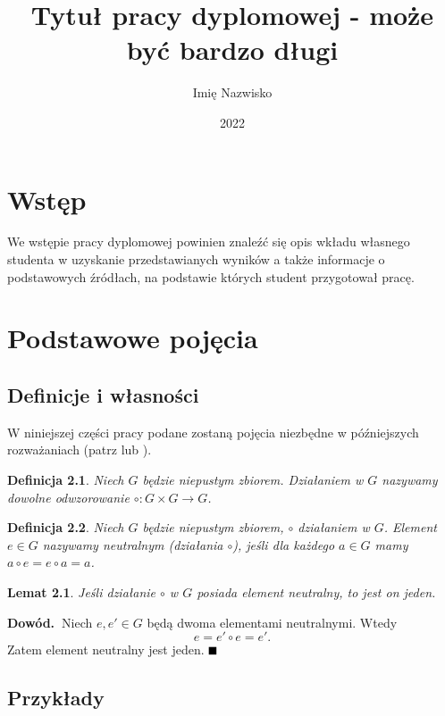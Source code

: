 \documentclass[magisterska]{pracadypl}
\author{Imię Nazwisko}
\title{Tytuł pracy dyplomowej - może być bardzo długi}
\date{2022}
\def\pd{\noindent \textbf{Dowód.~}} %
\def\kd{\hfill\mbox{$\rule{2mm}{2mm}$}} %
\newtheorem{defi}{Definicja}[section]
\newtheorem{lem}{Lemat}[section]
\begin{document}
\maketitle
\tableofcontents
\newpage



\chapter{Wstęp}

We wstępie pracy dyplomowej powinien znaleźć się opis wkładu własnego studenta w uzyskanie przedstawianych wyników a także informacje o podstawowych źródłach, na podstawie których student przygotował pracę.


\chapter{Podstawowe pojęcia}

\section{Definicje i własności}

W niniejszej części pracy podane zostaną pojęcia niezbędne w późniejszych rozważaniach (patrz \cite{Kostrykin} lub \cite{Lang}).
\begin{defi}
Niech $G$ będzie niepustym zbiorem. Działaniem w $G$ nazywamy dowolne odwzorowanie $\circ:G\times G\to G$.
\end{defi}

\begin{defi}
Niech $G$ będzie niepustym zbiorem, $\circ$ działaniem w $G$. Element $e\in G$ nazywamy neutralnym (działania $\circ$), jeśli dla każdego $a\in G$ mamy $a\circ e=e\circ a=a$.
\end{defi}

\begin{lem}\label{lem:element_neutralny}
Jeśli działanie $\circ$ w $G$ posiada element neutralny, to jest on jeden.
\end{lem}
\pd Niech $e,e'\in G$ będą dwoma elementami neutralnymi. Wtedy
\begin{equation}\label{eq:element_neutralny}
e=e'\circ e=e'.
\end{equation}
Zatem element neutralny jest jeden. \kd


\section{Przykłady}
\end{document}
